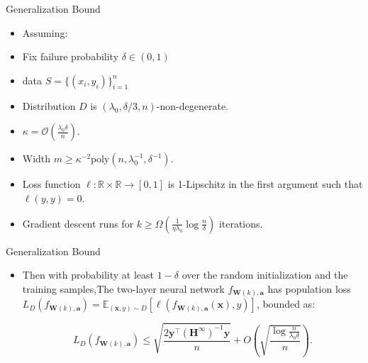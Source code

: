 \documentclass[serif, aspectratio=169]{beamer}
\begin{document}
\begin{frame}{Generalization Bound}


\begin{itemize}
	\item Assuming:
		\item Fix failure probability \(\delta \in (0,1)\)
		\item data \(S = \{(x_i,y_i)\}_{i=1}^n\)
		\item Distribution \( D \) is \( (\lambda_0, \delta/3, n) \)-non-degenerate.
		\item \( \kappa = \mathcal{O}\left( \frac{\lambda_0 \delta}{n} \right) \).
		\item Width \( m \geq \kappa^{-2} \text{poly}(n, \lambda_0^{-1}, \delta^{-1}) \).
		\item Loss function \( \ell: \mathbb{R} \times \mathbb{R} \to [0, 1] \) is 1-Lipschitz in the first
		argument such that \( \ell(y, y) = 0 \).
		\item Gradient descent runs for \( k \geq \Omega\left( \frac{1}{\eta \lambda_0} \log \frac{n}{\delta} \right) \) iterations.
	

\end{itemize}

\end{frame}



\begin{frame}{Generalization Bound}
	
	
	\begin{itemize}
	\item Then with probability at least  \(1-\delta\) over the random initialization and the training
	samples,The two-layer neural network \(f_{\mathbf{W}(k), \mathbf{a}}\) has population loss \( L_D(f_{\mathbf{W}(k), \mathbf{a}}) = \mathbb{E}_{(\mathbf{x},y)\sim D}[\ell(f_{\mathbf{W}(k), \mathbf{a}}(\mathbf{x}),y)] \), bounded as: 
	
		
		\[
		L_D(f_{\mathbf{W}(k), \mathbf{a}}) \leq \sqrt{\frac{2 \mathbf{y}^\top (\mathbf{H}^\infty)^{-1} \mathbf{y}}{n}} + O\left( \sqrt{\frac{\log \frac{n}{\lambda_0 \delta}}{n}} \right).
		\]
		
	\end{itemize}
	
\end{frame}
\end{document}
